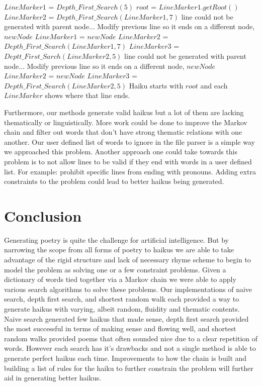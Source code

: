 \documentclass[]{article}
\begin{document}
\begin{algorithm}[H]
	\caption{$Depth\_First\_Search\_Whole\_Haiku()$} \label{Alg:DFSWhole}
	\begin{algorithmic}[1]
		\State $LineMarker1$ = $Depth\_First\_Search(5)$
		\State $root$ = $LineMarker1.getRoot()$
		\State $LineMarker2$ = $Depth\_First\_Search(LineMarker1, 7)$
		 line could not be generated with parent node...
			\State Modify previous line so it ends on a different node, $newNode$
			\State $LineMarker1$ = $newNode$
			\State $LineMarker2$ = $Depth\_First\_Search(LineMarker1,7)$
		\EndIf
		\State $LineMarker3$ = $Deptt\_First\_Sarch(LineMarker2,5)$
		 line could not be generated with parent node...
			\State Modify previous line so it ends on a different node, $newNode$
			\State $LineMarker2$ = $newNode$
			\State $LineMarker3$ = $Depth\_First\_Search(LineMarker2,5)$
		\EndIf
		\State Haiku starts with $root$ and each $LineMarker$ shows where that line ends.
	\end{algorithmic}
\end{algorithm}

Furthermore, our methods generate valid haikus but a lot of them are lacking thematically or linguistically. More work could be done to improve the Markov chain and filter out words that don't have strong thematic relations with one another. Our user defined list of words to ignore in the file parser is a simple way we approached this problem. Another approach one could take towards this problem is to not allow lines to be valid if they end with words in a user defined list. For example: prohibit specific lines from ending with pronouns. Adding extra constraints to the problem could lead to better haikus being generated.

\section{Conclusion}
Generating poetry is quite the challenge for artificial intelligence. But by narrowing the scope from all forms of poetry to haikus we are able to take advantage of the rigid structure and lack of necessary rhyme scheme to begin to model the problem as solving one or a few constraint problems. Given a dictionary of words tied together via a Markov chain we were able to apply various search algorithms to solve these problems. Our implementations of naive search, depth first search, and shortest random walk each provided a way to generate haikus with varying, albeit random, fluidity and thematic contents. Naive search generated few haikus that made sense, depth first search provided the most successful in terms of making sense and flowing well, and shortest random walks provided poems that often sounded nice due to a clear repetition of words. However each search has it's drawbacks and not a single method is able to generate perfect haikus each time. Improvements to how the chain is built and building a list of rules for the haiku to further constrain the problem will further aid in generating better haikus.



\end{document}
